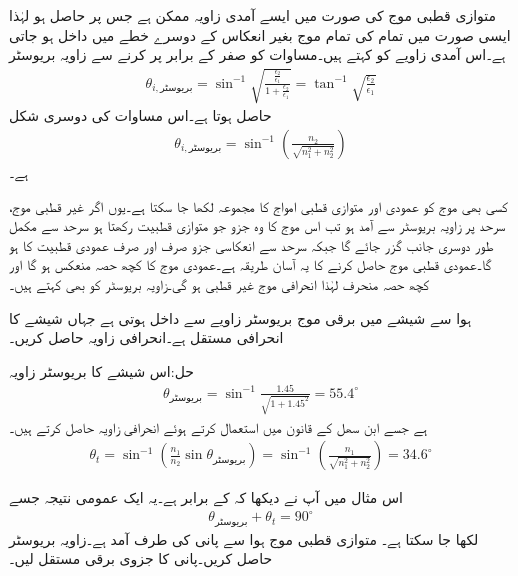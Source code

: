 متوازی قطبی موج کی صورت میں ایسے آمدی زاویہ ممکن ہے جس پر   حاصل ہو لہٰذا ایسی صورت میں تمام کی تمام موج بغیر انعکاس کے دوسرے خطے میں داخل ہو جاتی ہے۔اس آمدی زاویے کو  کہتے ہیں۔مساوات  کو صفر کے برابر پر کرنے سے زاویہ بریوسٹر 
\begin{align}
\theta_{i,\text{بریوسٹر}} =\sin^{-1} \sqrt{\frac{\frac{\epsilon_2}{\epsilon_1}}{1+\frac{\epsilon_2}{\epsilon_1}}}=\tan^{-1} \sqrt{\frac{\epsilon_2}{\epsilon_1}}
\end{align} 
حاصل ہوتا ہے۔اس مساوات کی دوسری شکل
\begin{align}
\theta_{i,\text{بریوسٹر}}= \sin^{-1} \left(\frac{n_2}{\sqrt{n_1^2+n_2^2}}\right)
\end{align}
ہے۔

کسی بھی موج کو عمودی اور متوازی قطبی امواج کا مجموعہ لکھا جا سکتا ہے۔یوں اگر غیر قطبی موج، سرحد پر  زاویہ بریوسٹر سے آمد ہو تب اس موج کا وہ جزو جو متوازی قطبیت رکھتا ہو سرحد سے مکمل طور دوسری جانب گزر جائے گا جبکہ سرحد سے انعکاسی جزو صرف اور صرف عمودی قطبیت کا ہو گا۔عمودی قطبی موج حاصل کرنے کا یہ آسان طریقہ ہے۔عمودی موج کا کچھ حصہ منعکس ہو گا اور کچھ حصہ منحرف لہٰذا انحرافی موج غیر قطبی ہو گی۔زاویہ بریوسٹر کو  بھی کہتے ہیں۔  

ہوا سے شیشے  میں برقی موج بریوسٹر زاویے سے داخل ہوتی ہے جہاں شیشے کا انحرافی مستقل  ہے۔انحرافی زاویہ حاصل کریں۔

حل:اس شیشے کا بریوسٹر زاویہ
\begin{align*}
\theta_{\text{بریوسٹر}} = \sin^{-1} \frac{1.45}{\sqrt{1+1.45^2}}=55.4^{\circ}
\end{align*}
ہے جسے ابن سھل کے قانون میں استعمال کرتے ہوئے انحرافی زاویہ حاصل کرتے ہیں۔
\begin{align*}
\theta_t=\sin^{-1} \left(\frac{n_1}{n_2} \sin \theta_{\text{بریوسٹر}} \right)=\sin^{-1} \left(\frac{n_1}{\sqrt{n_1^2+n_2^2}}\right)=34.6^{\circ}
\end{align*}

اس مثال میں آپ نے دیکھا کہ  کے برابر ہے۔یہ ایک عمومی نتیجہ جسے
\begin{align}
\theta_{\text{بریوسٹر}} +\theta_{t}=90^{\circ}
\end{align}
لکھا جا سکتا ہے۔
متوازی قطبی موج ہوا سے پانی کی طرف آمد ہے۔زاویہ بریوسٹر حاصل کریں۔پانی کا جزوی برقی مستقل  لیں۔

